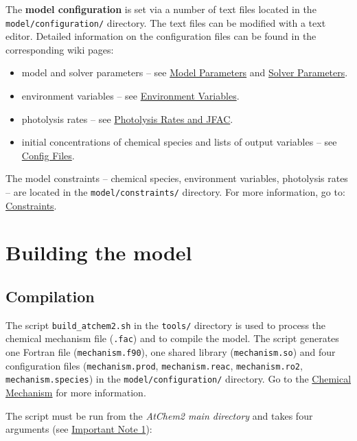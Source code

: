 The \textbf{model configuration} is set via a number of text files
located in the \texttt{model/configuration/} directory. The text files
can be modified with a text editor. Detailed information on the
configuration files can be found in the corresponding wiki pages:

\begin{itemize}
\item model and solver parameters -- see
  \hyperref[sec:parameters]{Model Parameters} and
  \hyperref[sec:solver]{Solver Parameters}.
\item environment variables -- see \hyperref[sec:envvar]{Environment
    Variables}.
\item photolysis rates -- see \hyperref[sec:photolysis]{Photolysis
    Rates and JFAC}.
\item initial concentrations of chemical species and lists of output
  variables -- see \hyperref[sec:config]{Config Files}.
\end{itemize}

The model constraints -- chemical species, environment variables,
photolysis rates -- are located in the \texttt{model/constraints/}
directory. For more information, go to:
\hyperref[sec:constraints]{Constraints}.

\section{Building the model} \label{sec:build}

\subsection{Compilation} \label{subsec:compilation}

The script \texttt{build\_atchem2.sh} in the \texttt{tools/} directory is used
to process the chemical mechanism file (\texttt{.fac}) and to compile
the model. The script generates one Fortran file
(\texttt{mechanism.f90}), one shared library (\texttt{mechanism.so})
and four configuration files (\texttt{mechanism.prod},
\texttt{mechanism.reac}, \texttt{mechanism.ro2},
\texttt{mechanism.species}) in the \texttt{model/configuration/}
directory. Go to the \hyperref[sec:mechanism]{Chemical Mechanism} for
more information.

The script must be run from the \emph{AtChem2 main directory} and
takes four arguments (see \hyperref[important-note-1]{Important Note
  1}):

